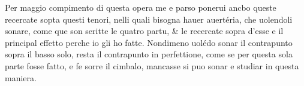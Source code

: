 Per maggio compimento di questa opera me e parso ponerui ancbo queste recercate sopta questi tenori, nelli quali bisogna hauer auertéria, che uolendoli sonare, come que son seritte le quatro partu, \& le recercate sopra d'esse e il principal effetto perche io gli ho fatte. Nondimeno uolédo sonar il contrapunto sopra il basso solo, resta il contrapunto in perfettione, come se per questa sola parte fosse fatto, e fe sorre il cimbalo, mancasse si puo sonar e studiar in questa maniera.
